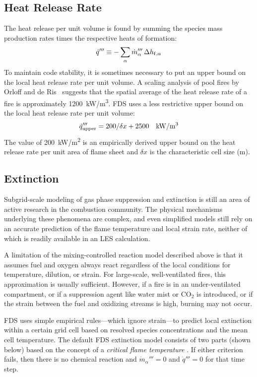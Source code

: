 \subsection{Heat Release Rate}
\label{sec:hrr}

The heat release per unit volume is found by summing the species mass production rates times the respective heats of formation:
\begin{equation}\label{eq:vol_heat_gen}
\dot{q}''' \equiv -\displaystyle \sum_{\alpha} \dot{m}_{\alpha}''' \, \Delta h_{{\rm f},\alpha}
\end{equation}
To maintain code stability, it is sometimes necessary to put an upper bound on the local heat release rate per unit volume. A scaling analysis of pool fires by Orloff and de Ris~\cite{Orloff:19th_Symposium} suggests that the spatial average of the heat release rate of a fire is approximately \SI{1200}{kW/m^3}. FDS uses a less restrictive upper bound on the local heat release rate per unit volume:
\begin{equation}
   \dq_{\rm upper}''' = 200/\dx + 2500 \quad \si{kW/m^3}  \label{eq:q_bound}
\end{equation}
The value of \SI{200}{kW/m^2} is an empirically derived upper bound on the heat release rate per unit area of flame sheet and $\delta x$ is the characteristic cell size (m).


\subsection{Extinction}
\label{extinction}

Subgrid-scale modeling of gas phase suppression and extinction is still an area of active research in the combustion community. The physical mechanisms underlying these phenomena are complex, and even simplified models still rely on an accurate prediction of the flame temperature and local strain rate, neither of which is readily available in an LES calculation.

A limitation of the mixing-controlled reaction model described above is that it assumes fuel and oxygen always react regardless of the local conditions for temperature, dilution, or strain. For large-scale, well-ventilated fires, this approximation is usually sufficient. However, if a fire is in an under-ventilated compartment, or if a suppression agent like water mist or CO$_2$ is introduced, or if the strain between the fuel and oxidizing streams is high, burning may not occur.

FDS uses simple empirical rules---which ignore strain---to predict local extinction within a certain grid cell based on resolved species concentrations and the mean cell temperature.  The default FDS extinction model consists of two parts (shown below) based on the concept of a \emph{critical flame temperature} \cite{SFPE:Beyler}. If either criterion fails, then there is no chemical reaction and $\dot{m}_\alpha'''=0$ and $\dot{q}'''=0$ for that time step.

